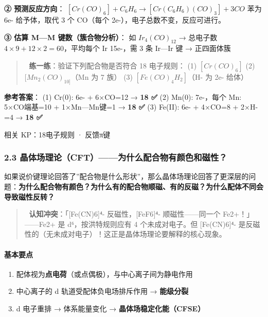 \documentclass[a4paper,11pt]{ctexart}
\providecommand{\tightlist}{\setlength{\itemsep}{0pt}\setlength{\parskip}{0pt}}
\begin{document}
\textbf{② 预测反应方向}：
\([Cr(CO)_6] + C_6H_6 \rightarrow [Cr(C_6H_6)(CO)_3] + 3CO\)
苯为 6e- 给予体，取代 3 个 CO（每个 2e-），电子总数不变，反应可进行。

\textbf{③ 估算 M---M 键数（簇合物分析）}：
如 \(Ir_4(CO)_{12}\) → 总电子数 \(4 \times 9 + 12 \times 2 = 60\)，平均每个 Ir 15e-，需 3 条 Ir---Ir 键 → 正四面体簇

\begin{quote}
📝 \textbf{练一练}：验证下列配合物是否符合 18 电子规则：
(1) \([Cr(CO)_6]\)
(2) \([Mn_2(CO)_{10]}\)（Mn 为 7 族）
(3) \([Fe(CO)_4H_2]\)（H- 为 2e- 给体）
\end{quote}

\textbf{参考答案}：
(1) Cr(0): 6e- + 6×CO=12 → \textbf{18 ✅}
(2) Mn(0): 7e-，每个 Mn: 5×CO端基=10 + 1×Mn---Mn键=1 → \textbf{18 ✅}
(3) Fe(II): 6e- + 4×CO=8 + 2×H-=4 → \textbf{18 ✅}

相关 KP：18电子规则 · 反馈π键

\subsubsection{2.3 晶体场理论（CFT）------为什么配合物有颜色和磁性？}\label{ux6676ux4f53ux573aux7406ux8bbacftux4e3aux4ec0ux4e48ux914dux5408ux7269ux6709ux989cux8272ux548cux78c1ux6027}

如果说价键理论回答了''配合物是什么形状''，那么晶体场理论回答了更深层的问题：\textbf{为什么配合物有颜色？为什么有的配合物顺磁、有的反磁？为什么配体不同会导致磁性反转？}

\begin{quote}
🧠 \textbf{认知冲突}：「{[}Fe(CN)6{]}⁴- 反磁性，{[}FeF6{]}⁴- 顺磁性------同一个 Fe2+！」------Fe2+ 是 d⁶，按洪特规则应有 4 个未成对电子。但 {[}Fe(CN)6{]}⁴- 是反磁性的（无未成对电子）！这正是晶体场理论要解释的核心现象。
\end{quote}

\paragraph{基本要点}\label{ux57faux672cux8981ux70b9}

\begin{enumerate}
\def\labelenumi{\arabic{enumi}.}
\tightlist
\item
  配体视为\textbf{点电荷}（或点偶极），与中心离子间为静电作用
\item
  中心离子的 d 轨道受配体负电场排斥作用 → \textbf{能级分裂}
\item
  d 电子重排 → 体系能量变化 → \textbf{晶体场稳定化能（CFSE）}
\end{enumerate}
\end{document}

